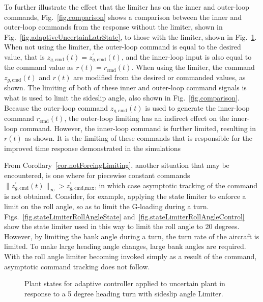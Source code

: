 To further illustrate the effect that the limiter has on the inner and outer-loop commands, Fig.~\ref{fig.comparison} shows a comparison between the inner and outer-loop commands from the response without the limiter, shown in Fig.~\ref{fig.adaptiveUncertainLatrState}, to those with the limiter, shown in Fig.~\ref{fig.stateLimiterState}.
When not using the limiter, the outer-loop command is equal to the desired value, that is $z_{g,\text{cmd}}(t)=z_{g,\text{cmd}}^{\prime}(t)$, and the inner-loop input is also equal to the command value as $r(t)=r_{\text{cmd}}(t)$.
When using the limiter, the command $z_{g,\text{cmd}}(t)$ and $r(t)$ are modified from the desired or commanded values, as shown.
The limiting of both of these inner and outer-loop command signals is what is used to limit the sideslip angle, also shown in Fig.~\ref{fig.comparison}.
Because the outer-loop command $z_{g,\text{cmd}}(t)$ is used to generate the inner-loop command $r_{\text{cmd}}(t)$, the outer-loop limiting has an indirect effect on the inner-loop command.
However, the inner-loop command is further limited, resulting in $r(t)$ as shown.
It is the limiting of these commands that is responsible for the improved time response demonstrated in the simulations

From Corollary~\ref{cor.notForcingLimiting}, another situation that may be encountered, is one where for piecewise constant commands $\|z_{g,\text{cmd}}^{\prime}(t)\|_{\infty}>z_{g,\text{cmd,max}}^{\prime}$, in which case asymptotic tracking of the command is not obtained.
Consider, for example, applying the state limiter to enforce a limit on the roll angle, so as to limit the G-loading during a turn.
Figs.~\ref{fig.stateLimiterRollAngleState} and~\ref{fig.stateLimiterRollAngleControl} show the state limiter used in this way to limit the roll angle to 20 degrees.
However, by limiting the bank angle during a turn, the turn rate of the aircraft is limited.
To make large heading angle changes, large bank angles are required.
With the roll angle limiter becoming invoked simply as a result of the command, asymptotic command tracking does not follow.

\newpage
\begin{figure}[H]
  \hspace{-0.5in}
  \noindent{}
  \vspace{-1.0in}
  \caption{Plant states for adaptive controller applied to uncertain plant in response to a 5 degree heading turn with sideslip angle Limiter.\label{fig.stateLimiterState}}
\end{figure}

